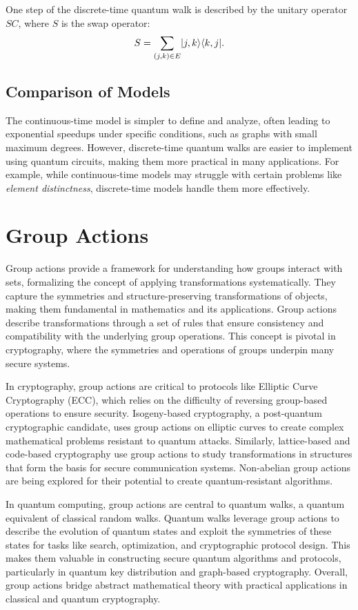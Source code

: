 \documentclass[11pt]{article}
\theoremstyle{definition}
\begin{document}
One step of the discrete-time quantum walk is described by the unitary operator \( SC \), where \( S \) is the swap operator:
\[
S = \sum_{(j,k) \in E}\lvert j,k\rangle\langle k,j\rvert.
\]

\subsection*{Comparison of Models}
The continuous-time model is simpler to define and analyze, often leading to exponential speedups under specific conditions, such as graphs with small maximum degrees. However, discrete-time quantum walks are easier to implement using quantum circuits, making them more practical in many applications. For example, while continuous-time models may struggle with certain problems like \textit{element distinctness}, discrete-time models handle them more effectively.





\section{Group Actions}

Group actions provide a framework for understanding how groups interact with sets, formalizing the concept of applying transformations systematically. They capture the symmetries and structure-preserving transformations of objects, making them fundamental in mathematics and its applications. Group actions describe transformations through a set of rules that ensure consistency and compatibility with the underlying group operations. This concept is pivotal in cryptography, where the symmetries and operations of groups underpin many secure systems.

In cryptography, group actions are critical to protocols like Elliptic Curve Cryptography (ECC), which relies on the difficulty of reversing group-based operations to ensure security. Isogeny-based cryptography, a post-quantum cryptographic candidate, uses group actions on elliptic curves to create complex mathematical problems resistant to quantum attacks. Similarly, lattice-based and code-based cryptography use group actions to study transformations in structures that form the basis for secure communication systems. Non-abelian group actions are being explored for their potential to create quantum-resistant algorithms.

In quantum computing, group actions are central to quantum walks, a quantum equivalent of classical random walks. Quantum walks leverage group actions to describe the evolution of quantum states and exploit the symmetries of these states for tasks like search, optimization, and cryptographic protocol design. This makes them valuable in constructing secure quantum algorithms and protocols, particularly in quantum key distribution and graph-based cryptography. Overall, group actions bridge abstract mathematical theory with practical applications in classical and quantum cryptography.
\end{document}
